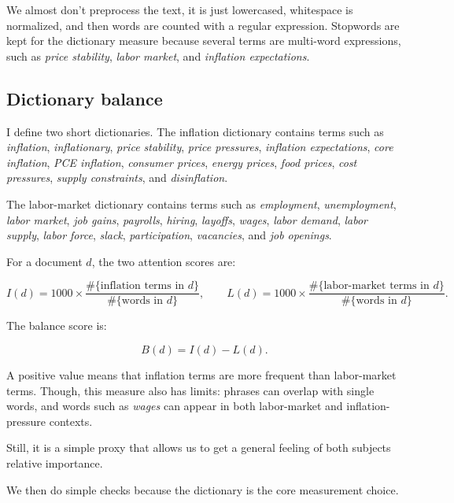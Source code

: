 \documentclass{article}
\begin{document}
We almost don't preprocess the text, it is just lowercased, whitespace is normalized, and then words are counted with a regular expression. Stopwords are kept for the dictionary
measure because several terms are multi-word expressions, such as \emph{price
stability}, \emph{labor market}, and \emph{inflation expectations}.

\subsection*{Dictionary balance}

I define two short dictionaries. The inflation dictionary contains terms such as
\emph{inflation}, \emph{inflationary}, \emph{price stability}, \emph{price pressures},
\emph{inflation expectations}, \emph{core inflation}, \emph{PCE inflation},
\emph{consumer prices}, \emph{energy prices}, \emph{food prices}, \emph{cost pressures},
\emph{supply constraints}, and \emph{disinflation}.

The labor-market dictionary contains terms such as \emph{employment},
\emph{unemployment}, \emph{labor market}, \emph{job gains}, \emph{payrolls},
\emph{hiring}, \emph{layoffs}, \emph{wages}, \emph{labor demand}, \emph{labor supply},
\emph{labor force}, \emph{slack}, \emph{participation}, \emph{vacancies}, and
\emph{job openings}.

For a document $d$, the two attention scores are:

\begin{equation}
    I(d) = 1000 \times
    \frac{\#\{\text{inflation terms in } d\}}
    {\#\{\text{words in } d\}},
    \qquad
    L(d) = 1000 \times
    \frac{\#\{\text{labor-market terms in } d\}}
    {\#\{\text{words in } d\}}.
\end{equation}

The balance score is:

\begin{equation}
    B(d) = I(d) - L(d).
    \label{eq:balance}
\end{equation}

A positive value means that inflation terms are more frequent than labor-market terms.
Though, this measure also has limits: phrases can overlap with single words, and words such as \emph{wages} can appear in both labor-market and inflation-pressure contexts.

Still, it is a simple proxy that allows us to get a general feeling of both subjects relative importance.

We then do simple checks because the dictionary is the core measurement choice. 
\end{document}
